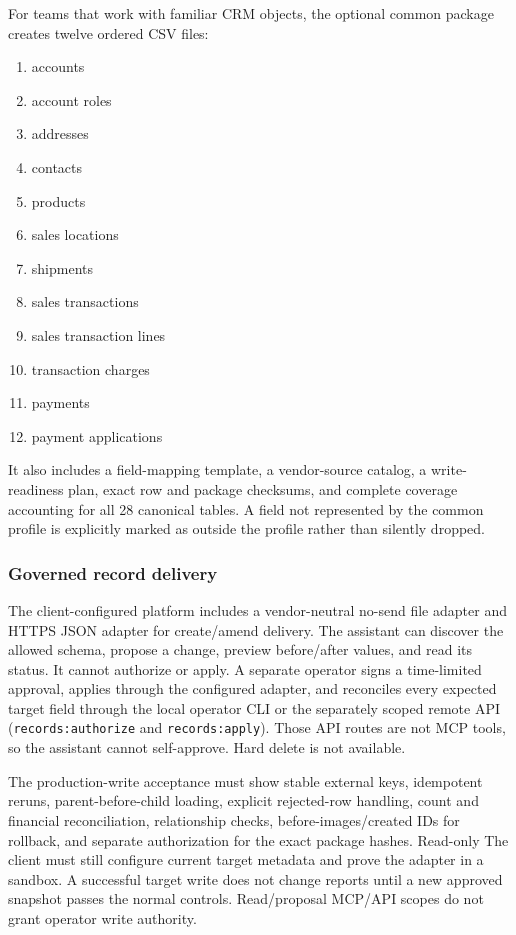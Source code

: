 \documentclass[
]{article}
\providecommand{\tightlist}{%
  \setlength{\itemsep}{0pt}\setlength{\parskip}{0pt}}
\begin{document}
For teams that work with familiar CRM objects, the optional common
package creates twelve ordered CSV files:

\begin{enumerate}
\def\labelenumi{\arabic{enumi}.}
\tightlist
\item
  accounts
\item
  account roles
\item
  addresses
\item
  contacts
\item
  products
\item
  sales locations
\item
  shipments
\item
  sales transactions
\item
  sales transaction lines
\item
  transaction charges
\item
  payments
\item
  payment applications
\end{enumerate}

It also includes a field-mapping template, a vendor-source catalog, a
write-readiness plan, exact row and package checksums, and complete
coverage accounting for all 28 canonical tables. A field not represented
by the common profile is explicitly marked as outside the profile rather
than silently dropped.

\subsubsection{Governed record delivery}\label{governed-record-delivery}

The client-configured platform includes a vendor-neutral no-send file
adapter and HTTPS JSON adapter for create/amend delivery. The assistant
can discover the allowed schema, propose a change, preview before/after
values, and read its status. It cannot authorize or apply. A separate
operator signs a time-limited approval, applies through the configured
adapter, and reconciles every expected target field through the local
operator CLI or the separately scoped remote API
(\texttt{records:authorize} and \texttt{records:apply}). Those API
routes are not MCP tools, so the assistant cannot self-approve. Hard
delete is not available.

The production-write acceptance must show stable external keys,
idempotent reruns, parent-before-child loading, explicit rejected-row
handling, count and financial reconciliation, relationship checks,
before-images/created IDs for rollback, and separate authorization for
the exact package hashes. Read-only The client must still configure
current target metadata and prove the adapter in a sandbox. A successful
target write does not change reports until a new approved snapshot
passes the normal controls. Read/proposal MCP/API scopes do not grant
operator write authority.
\end{document}
